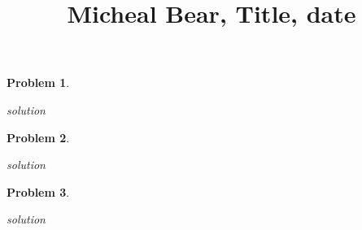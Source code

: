 \documentclass[11pt,twoside]{amsart}
\title {Micheal Bear, Title, date}
\newtheorem{prob}{Problem}
\begin{document}
	\maketitle	

\begin{prob} %

\end{prob}
\emph{solution}


\begin{prob} %
 
\end{prob}
\emph{solution}


\begin{prob} %

\end{prob}
\emph{solution}

	
\end{document}
